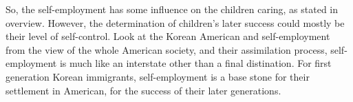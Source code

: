 So, the self-employment has some influence on the children caring, as stated in
overview. However, the determination of children's later success could mostly
be their level of self-control. Look at the Korean American and self-employment
from the view of the whole American society, and their assimilation process,
self-employment is much like an interstate other than a final distination. For
first generation Korean immigrants, self-employment is a base stone for their
settlement in American, for the success of their later generations.
